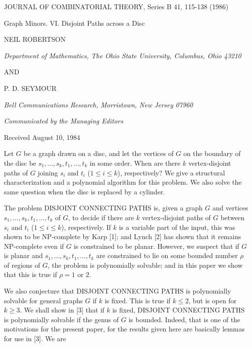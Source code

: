 JOURNAL OF COMBINATORIAL THEORY, Series B 41, 115-138 (1986)

Graph Minors. VI. Disjoint Paths across a Disc

NEIL ROBERTSON

\textit{Department of Mathematics, The Ohio State University, Columbus, Ohio 43210}

AND

P. D. SEYMOUR

\textit{Bell Communications Research, Morristown, New Jersey 07960}

\textit{Communicated by the Managing Editors}

Received August 10, 1984

Let $G$ be a graph drawn on a disc, and let the vertices of $G$ on the boundary of the disc be $s_1, \dots, s_k, t_1, \dots, t_k$ in some order. When are there $k$ vertex-disjoint paths of $G$ joining $s_i$ and $t_i$ ($1 \le i \le k$), respectively? We give a structural characterization and a polynomial algorithm for this problem. We also solve the same question when the disc is replaced by a cylinder.


The problem DISJOINT CONNECTING PATHS is, given a graph $G$ and vertices $s_1, \dots, s_k, t_1, \dots, t_k$ of $G$, to decide if there are $k$ vertex-disjoint paths of $G$ between $s_i$ and $t_i$ ($1 \le i \le k$), respectively. If $k$ is a variable part of the input, this was shown to be NP-complete by Karp [1]; and Lynch [2] has shown that it remains NP-complete even if $G$ is constrained to be planar. However, we suspect that if $G$ is planar and $s_1, \dots, s_k, t_1, \dots, t_k$ are constrained to lie on some bounded number $\rho$ of regions of $G$, the problem is polynomially solvable; and in this paper we show that this is true if $\rho = 1$ or $2$.

We also conjecture that DISJOINT CONNECTING PATHS is polynomially solvable for general graphs $G$ if $k$ is fixed. This is true if $k \le 2$, but is open for $k \ge 3$. We shall show in [3] that if $k$ is fixed, DISJOINT CONNECTING PATHS is polynomially solvable if the genus of $G$ is bounded. Indeed, that is one of the motivations for the present paper, for the results given here are basically lemmas for use in [3]. We are

